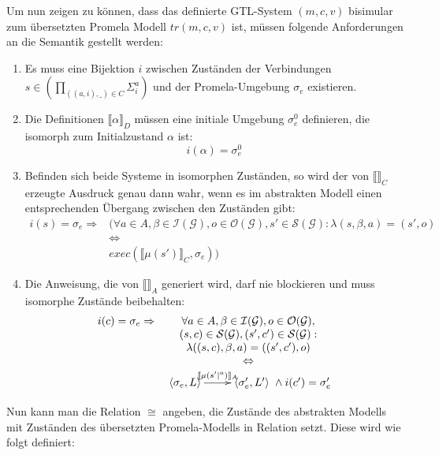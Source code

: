 Um nun zeigen zu können, dass das definierte GTL-System $(m,c,v)$ bisimular zum übersetzten Promela Modell $tr(m,c,v)$ ist, müssen folgende Anforderungen an die Semantik gestellt werden:
\begin{enumerate}
\item Es muss eine Bijektion $i$ zwischen Zuständen der Verbindungen $s\in\left(\prod_{((a,i),\_)\in C} \Sigma^a_i\right)$ und der Promela-Umgebung $\sigma_e$ existieren.
\item Die Definitionen $\llbracket \alpha \rrbracket_D$ müssen eine initiale Umgebung $\sigma_e^0$ definieren, die isomorph zum Initialzustand $\alpha$ ist: 
  \[ i(\alpha) = \sigma_e^0 \]
\item Befinden sich beide Systeme in isomorphen Zuständen, so wird der von $\llbracket \rrbracket_C$ erzeugte Ausdruck genau dann wahr, wenn es im abstrakten Modell einen entsprechenden Übergang zwischen den Zuständen gibt:
  \[ \begin{array}{rc}
    i(s) = \sigma_e \Rightarrow &
    (\forall a\in A,\beta\in\mathcal{I}(\mathcal{G}),o\in\mathcal{O}(\mathcal{G}),s'\in\mathcal{S}(\mathcal{G}): \lambda(s,\beta,a)=(s',o)\\
    & \Leftrightarrow\\
    & \mathit{exec}(\llbracket \mu(s')\rrbracket_C,\sigma_e))
  \end{array} \]
\item Die Anweisung, die von $\llbracket \rrbracket_A$ generiert wird, darf nie blockieren und muss isomorphe Zustände beibehalten:
  \[ \begin{array}{rc}
    i(c) = \sigma_e \Rightarrow &
    \forall a\in A,\beta\in\mathcal{I}(\mathcal{G}),o\in\mathcal{O}(\mathcal{G}),\\
    & (s,c)\in\mathcal{S}(\mathcal{G}),(s',c')\in\mathcal{S}(\mathcal{G}):\\
    & \lambda((s,c),\beta,a)=((s',c'),o)\\
    & \Leftrightarrow\\
    & \xymatrix { \left<\sigma_e,L\right> \ar[r]^-{\llbracket \mu(s'|^a)\rrbracket_A} & \left<\sigma_e',L'\right> } \land i(c') = \sigma_e'
  \end{array} \]
\end{enumerate}
Nun kann man die Relation $\cong$ angeben, die Zustände des abstrakten Modells mit Zuständen des übersetzten Promela-Modells in Relation setzt.
Diese wird wie folgt definiert:
